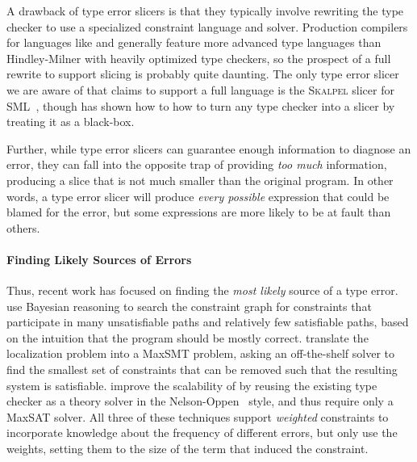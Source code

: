 A drawback of type error slicers is that they typically involve
rewriting the type checker to use a specialized constraint language and
solver.
%
Production compilers for languages like \ocaml and \haskell generally
feature more advanced type languages than Hindley-Milner with heavily
optimized type checkers, so the prospect of a full rewrite to support
slicing is probably quite daunting.
%
The only type error slicer we are aware of that claims to support a full
language is the \textsc{Skalpel} slicer for
\textsc{SML}~\citep{Rahli2010-ps,Rahli2015-tt}, though
\citet{Schilling2011-yf} has shown how to how to turn any type checker
into a slicer by treating it as a black-box.

Further, while type error slicers can guarantee enough information to
diagnose an error, they can fall into the opposite trap of providing
\emph{too much} information, producing a slice that is not much smaller
than the original program.
%
In other words, a type error slicer will produce \emph{every possible}
expression that could be blamed for the error, but some expressions are
more likely to be at fault than others.

\paragraph{Finding Likely Sources of Errors}
Thus, recent work has focused on finding the \emph{most likely} source
of a type error.
%
\citeauthor{Zhang2015-yu}~\citep{Zhang2014-lv,Zhang2015-yu} use Bayesian
reasoning to search the constraint graph for constraints that
participate in many unsatisfiable paths and relatively few satisfiable
paths, based on the intuition that the program should be mostly correct.
%
\citet{Pavlinovic2014-mr,Pavlinovic2015-kh} translate the localization
problem into a MaxSMT problem, asking an off-the-shelf solver to find
the smallest set of constraints that can be removed such that the
resulting system is satisfiable.
%
\citet{Loncaric2016-uk} improve the scalability of
\citeauthor{Pavlinovic2014-mr} by reusing the existing type checker as
a theory solver in the Nelson-Oppen~\citep{Nelson1979-td}
style, and thus require only a MaxSAT solver.
%
All three of these techniques support \emph{weighted} constraints to
incorporate knowledge about the frequency of different errors,
but only \citeauthor{Pavlinovic2014-mr} use the weights, setting them to
the size of the term that induced the constraint.


